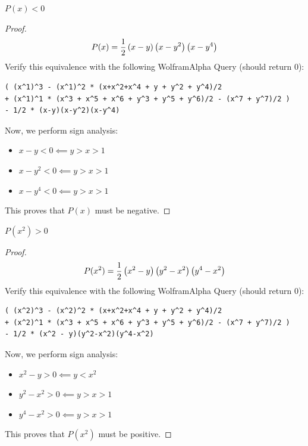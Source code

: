 \documentclass[10pt]{../usamts}
\begin{document}
\begin{solution}{4}
\begin{claim}
    $P(x) < 0$
    \label{claim:px}
\end{claim}
\begin{proof}
    $$P(x) = \frac{1}{2}\left( x-y \right)\left( x-y^2 \right)\left( x-y^4 \right)$$
    Verify this equivalence with the following WolframAlpha Query (should return 0): 
    \begin{verbatim}
( (x^1)^3 - (x^1)^2 * (x+x^2+x^4 + y + y^2 + y^4)/2 
+ (x^1)^1 * (x^3 + x^5 + x^6 + y^3 + y^5 + y^6)/2 - (x^7 + y^7)/2 )
- 1/2 * (x-y)(x-y^2)(x-y^4)
    \end{verbatim}
    Now, we perform sign analysis:
    \begin{itemize}
        \item $x - y < 0 \impliedby y > x > 1$
        \item $x - y^2 < 0 \impliedby y > x > 1$
        \item $x - y^4 < 0 \impliedby y > x > 1$
    \end{itemize}
    This proves that $P(x)$ must be negative.
\end{proof}

\begin{claim}
    $P(x^2) > 0$
    \label{claim:px2}
\end{claim}
\begin{proof}
    $$P(x^2) = \frac{1}{2} \left( x^2-y \right)\left( y^2 - x^2 \right)\left( y^4 - x^2 \right)$$
    Verify this equivalence with the following WolframAlpha Query (should return 0): 
    \begin{verbatim}
( (x^2)^3 - (x^2)^2 * (x+x^2+x^4 + y + y^2 + y^4)/2 
+ (x^2)^1 * (x^3 + x^5 + x^6 + y^3 + y^5 + y^6)/2 - (x^7 + y^7)/2 )
- 1/2 * (x^2 - y)(y^2-x^2)(y^4-x^2)
    \end{verbatim}
    Now, we perform sign analysis:
    \begin{itemize}
        \item $x^2 - y > 0 \impliedby y < x^2$
        \item $y^2 - x^2 > 0 \impliedby y > x > 1$
        \item $y^4 - x^2 > 0 \impliedby y > x > 1$
    \end{itemize}
    This proves that $P(x^2)$ must be positive.
\end{proof}


\end{solution}
\end{document}
